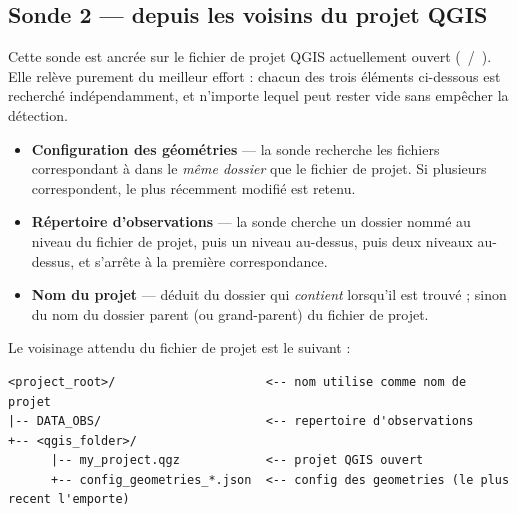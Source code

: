 
\subsection{Sonde 2 --- depuis les voisins du projet QGIS}
\label{ssec-auto-neighbors}

Cette sonde est ancrée sur le fichier de projet QGIS actuellement ouvert (~/~). Elle relève purement du meilleur effort : chacun des trois éléments ci-dessous est recherché indépendamment, et n'importe lequel peut rester vide sans empêcher la détection.

\begin{itemize}
    \item \textbf{Configuration des géométries} --- la sonde recherche les fichiers correspondant à  dans le \emph{même dossier} que le fichier de projet. Si plusieurs correspondent, le plus récemment modifié est retenu.

    \item \textbf{Répertoire d'observations} --- la sonde cherche un dossier nommé  au niveau du fichier de projet, puis un niveau au-dessus, puis deux niveaux au-dessus, et s'arrête à la première correspondance.

    \item \textbf{Nom du projet} --- déduit du dossier qui \emph{contient}  lorsqu'il est trouvé ; sinon du nom du dossier parent (ou grand-parent) du fichier de projet.
\end{itemize}

Le voisinage attendu du fichier de projet est le suivant :

\begin{lstlisting}[caption={Organisation attendue autour du fichier de projet QGIS.},captionpos=b,frame=lines,basicstyle=\ttfamily\footnotesize]
<project_root>/                     <-- nom utilise comme nom de projet
|-- DATA_OBS/                       <-- repertoire d'observations
+-- <qgis_folder>/
      |-- my_project.qgz            <-- projet QGIS ouvert
      +-- config_geometries_*.json  <-- config des geometries (le plus recent l'emporte)
\end{lstlisting}

